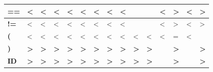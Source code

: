 \documentclass[a4paper, 11pt]{article}
\begin{document}
\begin{table}[!ht]
\begin{tabular}{|l|c|c|c|c|c|c|c|c|l|l|l|l|l|l|}
\textbf{==}             & \multicolumn{1}{l|}{\textless{}}             & \multicolumn{1}{l|}{\textless{}}             & \multicolumn{1}{l|}{\textless{}}             & \multicolumn{1}{l|}{\textless{}}             & \multicolumn{1}{l|}{\textless{}}             & \multicolumn{1}{l|}{\textless{}}             & \multicolumn{1}{l|}{\textless{}}             & \multicolumn{1}{l|}{\textless{}}             &                         &                         & \textless{}          & \textgreater{}          & \textless{}          & \textgreater{}          \\ \hline
\textbf{!=}             & \multicolumn{1}{l|}{\textless{}}             & \multicolumn{1}{l|}{\textless{}}             & \multicolumn{1}{l|}{\textless{}}             & \multicolumn{1}{l|}{\textless{}}             & \multicolumn{1}{l|}{\textless{}}             & \multicolumn{1}{l|}{\textless{}}             & \multicolumn{1}{l|}{\textless{}}             & \multicolumn{1}{l|}{\textless{}}             &                         &                         & \textless{}          & \textgreater{}          & \textless{}          & \textgreater{}          \\ \hline
\textbf{(}              & \multicolumn{1}{l|}{\textless{}}             & \multicolumn{1}{l|}{\textless{}}             & \multicolumn{1}{l|}{\textless{}}             & \multicolumn{1}{l|}{\textless{}}             & \multicolumn{1}{l|}{\textless{}}             & \multicolumn{1}{l|}{\textless{}}             & \multicolumn{1}{l|}{\textless{}}             & \multicolumn{1}{l|}{\textless{}}             & \textless{}             & \textless{}             & \textless{}          & =                       & \textless{}          &                         \\ \hline
\textbf{)}              & \multicolumn{1}{l|}{\textbf{\textgreater{}}} & \multicolumn{1}{l|}{\textbf{\textgreater{}}} & \multicolumn{1}{l|}{\textbf{\textgreater{}}} & \multicolumn{1}{l|}{\textbf{\textgreater{}}} & \multicolumn{1}{l|}{\textbf{\textgreater{}}} & \multicolumn{1}{l|}{\textbf{\textgreater{}}} & \multicolumn{1}{l|}{\textbf{\textgreater{}}} & \multicolumn{1}{l|}{\textbf{\textgreater{}}} & \textbf{\textgreater{}} & \textbf{\textgreater{}} & \textbf{}            & \textbf{\textgreater{}} & \textbf{}            & \textbf{\textgreater{}} \\ \hline
\textbf{ID}             & \multicolumn{1}{l|}{\textbf{\textgreater{}}} & \multicolumn{1}{l|}{\textbf{\textgreater{}}} & \multicolumn{1}{l|}{\textbf{\textgreater{}}} & \multicolumn{1}{l|}{\textbf{\textgreater{}}} & \multicolumn{1}{l|}{\textbf{\textgreater{}}} & \multicolumn{1}{l|}{\textbf{\textgreater{}}} & \multicolumn{1}{l|}{\textbf{\textgreater{}}} & \multicolumn{1}{l|}{\textbf{\textgreater{}}} & \textbf{\textgreater{}} & \textbf{\textgreater{}} & \textbf{}            & \textbf{\textgreater{}} & \textbf{}            & \textbf{\textgreater{}} \\ \hline

\end{tabular}
\end{table}
\end{document}
